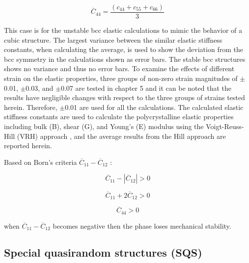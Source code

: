 \begin{equation}
\label{eq: averagec44}
\overline{C}_{44} = \frac{(c_{44} + c_{55} + c_{66})}{3}
\end{equation}

This case is for the unstable bcc elastic calculations to mimic the behavior of a cubic structure. The largest variance between the similar elastic stiffness constants, when calculating the average, is used to show the deviation from the bcc symmetry in the calculations shown as error bars. The stable bcc structures shows no variance and thus no error bars. To examine the effects of different strain on the elastic properties, three groups of non-zero strain magnitudes of $\pm$0.01, $\pm$0.03, and $\pm$0.07 are tested in chapter 5 and it can be noted that the results have negligible changes with respect to the three groups of strains tested herein. Therefore, $\pm$0.01 are used for all the calculations. The calculated elastic stiffness constants are used to calculate the polycrystalline elastic properties including bulk (B), shear (G), and Young’s (E) modulus using the Voigt-Reuss-Hill (VRH) approach \cite{Simmons1971b}, and the average results from the Hill approach are reported herein.

Based on Born's criteria $\overline{C}_{11}-\overline{C}_12$ \cite{Born1998,Nye1985}:

\begin{equation}
\label{eq: born1}
\overline{C}_{11} -|\overline{C}_{12}| > 0
\end{equation}

\begin{equation}
\label{eq: born2}
\overline{C}_{11} + 2\overline{C}_{12} > 0
\end{equation}

\begin{equation}
\label{eq: born3}
\overline{C}_{44} > 0
\end{equation}

when $\overline{C}_{11} - \overline{C}_{12}$  becomes negative then the phase loses mechanical stability. 

\subsection{Special quasirandom structures (SQS)}

